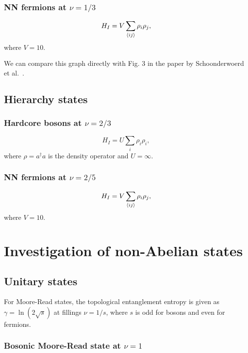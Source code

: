 \documentclass[floatfix,showpacs,amsmath,amsfonts,amssymb,aps,twocolumn, prb,groupedaddress]{revtex4-1}
\begin{document}
\subsubsection{NN fermions at $\nu=1/3$}

\begin{equation}
H_I = V \sum_{\braket{ij}} \rho_i \rho_j,
\end{equation}
where $V=10$.

We can compare this graph directly with Fig. 3 in the paper by Schoonderwoerd et al.~\cite{Schoonder19}.

\subsection{Hierarchy states}

\subsubsection{Hardcore bosons at $\nu=2/3$}

\begin{equation}
H_I = U \sum_i \rho_i \rho_i,
\end{equation}
where $\rho=a^\dagger a$ is the density operator and $U=\infty$.

\subsubsection{NN fermions at $\nu=2/5$}

\begin{equation}
H_I = V \sum_{\braket{ij}} \rho_i \rho_j,
\end{equation}
where $V=10$.

\section{Investigation of non-Abelian states}

\subsection{Unitary states}

For Moore-Read states, the topological entanglement entropy is given as $\gamma=\ln (2\sqrt{s})$ at fillings $\nu=1/s$, where $s$ is odd for bosons and even for fermions.~\cite{Glasser15}

\subsubsection{Bosonic Moore-Read state at $\nu=1$}
\end{document}
